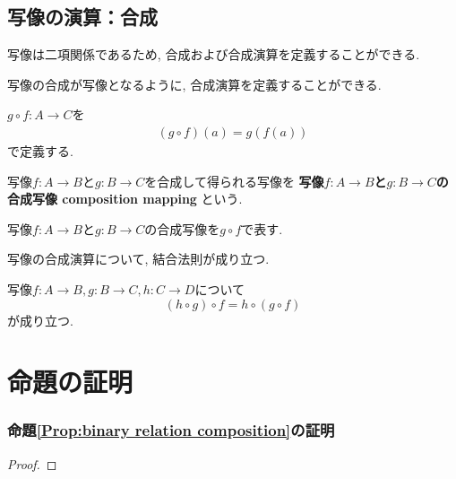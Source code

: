 \subsection{写像の演算：合成}
\begin{caution}\label{Prop:composition mapping}
写像は二項関係であるため,
合成および合成演算を定義することができる.
\end{caution}
\begin{caution}
写像の合成が写像となるように, 合成演算を定義することができる.
\end{caution}
\begin{Def}
$g\circ f:A\rightarrow C$を
\begin{align*}
(g\circ f)(a)=g(f(a))
\end{align*}
で定義する.
\end{Def}
\begin{Def}
写像$f:A\rightarrow B$と$g:B\rightarrow C$を合成して得られる写像を
{\bf 写像$f:A\rightarrow B$と$g:B\rightarrow C$の
合成写像 composition mapping}
という.
\end{Def}
\begin{Notation}
写像$f:A\rightarrow B$と$g:B\rightarrow C$の合成写像を$g\circ f$で表す.
\end{Notation}
\begin{Prop}\label{Prop:composition mapping associative law}
写像の合成演算について, 結合法則が成り立つ.

写像$f:A\rightarrow B, g:B\rightarrow C,
h:C\rightarrow D$について
\[
(h\circ g)\circ f=h\circ(g\circ f)
\]
が成り立つ.
\end{Prop}


\section{命題の証明}
\subsubsection{命題\ref{Prop:binary relation composition}の証明}
\begin{proof}
\end{proof}

